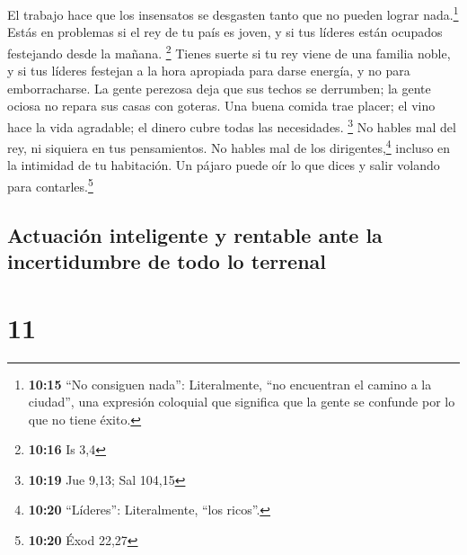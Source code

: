  El trabajo hace que los insensatos se desgasten tanto
que no pueden lograr nada.\footnote{\textbf{10:15} ``No consiguen
  nada'': Literalmente, ``no encuentran el camino a la ciudad'', una
  expresión coloquial que significa que la gente se confunde por lo que
  no tiene éxito.}  Estás en problemas si el rey de tu
país es joven, y si tus líderes están ocupados festejando desde la
mañana. \footnote{\textbf{10:16} Is 3,4}  Tienes suerte
si tu rey viene de una familia noble, y si tus líderes festejan a la
hora apropiada para darse energía, y no para emborracharse.
 La gente perezosa deja que sus techos se derrumben; la
gente ociosa no repara sus casas con goteras.  Una buena
comida trae placer; el vino hace la vida agradable; el dinero cubre
todas las necesidades. \footnote{\textbf{10:19} Jue 9,13; Sal 104,15}
 No hables mal del rey, ni siquiera en tus pensamientos.
No hables mal de los dirigentes,\footnote{\textbf{10:20} ``Líderes'':
  Literalmente, ``los ricos''.} incluso en la intimidad de tu
habitación. Un pájaro puede oír lo que dices y salir volando para
contarles.\footnote{\textbf{10:20} Éxod 22,27}

\hypertarget{actuaciuxf3n-inteligente-y-rentable-ante-la-incertidumbre-de-todo-lo-terrenal}{%
\subsection{Actuación inteligente y rentable ante la incertidumbre de
todo lo
terrenal}\label{actuaciuxf3n-inteligente-y-rentable-ante-la-incertidumbre-de-todo-lo-terrenal}}

\hypertarget{section-10}{%
\section{11}\label{section-10}}

